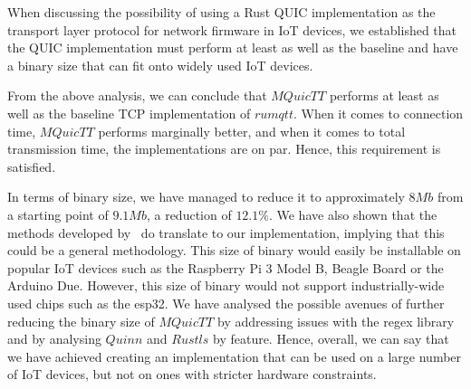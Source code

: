 When discussing the possibility of using a Rust QUIC implementation as the transport layer protocol for network firmware in IoT devices, we established that the QUIC implementation must perform at least as well as the baseline and have a binary size that can fit onto widely used IoT devices.

From the above analysis, we can conclude that $MQuicTT$ performs at least as well as the baseline TCP implementation of $rumqtt$.
When it comes to connection time, $MQuicTT$ performs marginally better, and when it comes to total transmission time, the implementations are on par.
Hence, this requirement is satisfied.

In terms of binary size, we have managed to reduce it to approximately $8Mb$ from a starting point of $9.1Mb$, a reduction of $12.1\%$.
We have also shown that the methods developed by~\citet{eggert_towards_2020} do translate to our implementation, implying that this could be a general methodology.
This size of binary would easily be installable on popular IoT devices such as the Raspberry Pi 3 Model B, Beagle Board or the Arduino Due.
However, this size of binary would not support industrially-wide used chips such as the esp32.
We have analysed the possible avenues of further reducing the binary size of $MQuicTT$ by addressing issues with the regex library and by analysing $Quinn$ and $Rustls$ by feature.
Hence, overall, we can say that we have achieved creating an implementation that can be used on a large number of IoT devices, but not on ones with stricter hardware constraints.
